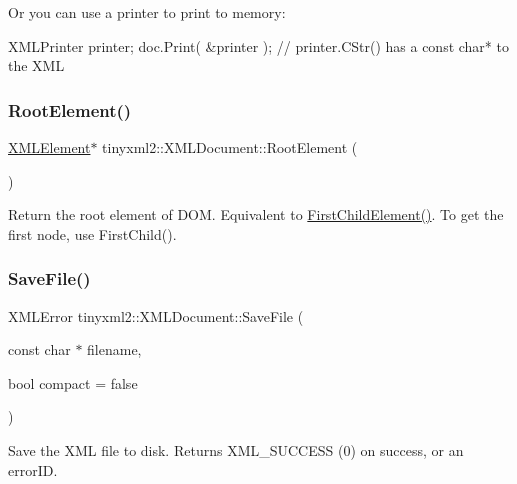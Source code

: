 Or you can use a printer to print to memory\+: \begin{DoxyVerb}XMLPrinter printer;
doc.Print( &printer );
// printer.CStr() has a const char* to the XML
\end{DoxyVerb}
 \mbox{\label{classtinyxml2_1_1XMLDocument_ad2b70320d3c2a071c2f36928edff3e1c}} 
\subsubsection{\texorpdfstring{RootElement()}{RootElement()}}
{\footnotesize\ttfamily \mbox{\hyperlink{classtinyxml2_1_1XMLElement}{X\+M\+L\+Element}}$\ast$ tinyxml2\+::\+X\+M\+L\+Document\+::\+Root\+Element (\begin{DoxyParamCaption}{ }\end{DoxyParamCaption})\hspace{0.3cm}{\ttfamily [inline]}}

Return the root element of D\+OM. Equivalent to \mbox{\hyperlink{classtinyxml2_1_1XMLNode_a1795a35852dc8aae877cc8ded986e59b}{First\+Child\+Element()}}. To get the first node, use First\+Child(). \mbox{\label{classtinyxml2_1_1XMLDocument_a73ac416b4a2aa0952e841220eb3da18f}} 
\subsubsection{\texorpdfstring{SaveFile()}{SaveFile()}\hspace{0.1cm}{\footnotesize\ttfamily [1/2]}}
{\footnotesize\ttfamily X\+M\+L\+Error tinyxml2\+::\+X\+M\+L\+Document\+::\+Save\+File (\begin{DoxyParamCaption}\item[{const char $\ast$}]{filename,  }\item[{bool}]{compact = {\ttfamily false} }\end{DoxyParamCaption})}

Save the X\+ML file to disk. Returns X\+M\+L\+\_\+\+S\+U\+C\+C\+E\+SS (0) on success, or an error\+ID. \mbox{\label{classtinyxml2_1_1XMLDocument_a8b95779479a0035acc67b3a61dfe1b74}} 
